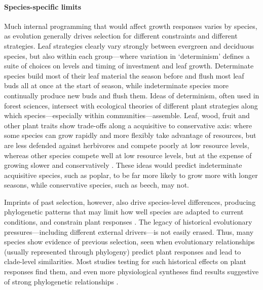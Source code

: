 \documentclass[11pt]{article}
\begin{document}
\paragraph{Species-specific limits}
Much internal programming that would affect growth responses varies by species, as evolution generally drives selection for different constraints and different strategies. Leaf strategies clearly vary strongly between evergreen and deciduous species, but also within each group---where variation in `determinism' defines a suite of choices on levels and timing of investment and leaf growth. Determinate species build most of their leaf material the season before and flush most leaf buds all at once at the start of season, while indeterminate species more continually produce new buds and flush them. Ideas of determinism, often used in forest sciences, intersect with ecological theories of different plant strategies along which species---especially within communities---assemble. Leaf, wood, fruit and other plant traits show trade-offs along a acquisitive to conservative axis: where some species can grow rapidly and more flexibly take advantage of resources, but are less defended against herbivores and compete poorly at low resource levels, whereas other species compete well at low resource levels, but at the expense of growing slower and conservatively \citep[][]{Grime:1977sw,diaz2016}. These ideas would predict indeterminate acquisitive species, such as poplar, to be far more likely to grow more with longer seasons, while conservative species, such as beech, may not. %

Imprints of past selection, however, also drive species-level differences, producing phylogenetic patterns that may limit how well species are adapted to current conditions, and constrain plant responses . The legacy of historical evolutionary pressures---including different external drivers---is not easily erased.  Thus, many species show evidence of previous selection, seen when evolutionary relationships (usually represented through phylogeny) predict plant responses and lead to clade-level similarities. Most studies testing for such historical effects on plant responses find them, and even more physiological syntheses find results suggestive of strong phylogenetic relationships \citep[though they do not always test them, e.g.,][]{way2010differential}. 
\end{document}
